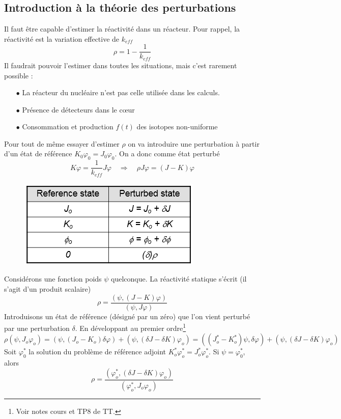 	\subsection{Introduction à la théorie des perturbations}
	Il faut être capable d'estimer la réactivité dans un réacteur. Pour rappel, la réactivité est la 
	variation effective de $k_{eff}$
	\begin{equation}
	\rho  = 1 - \frac{1}{{{k_{eff}}}}
	\end{equation}	
	Il faudrait pouvoir l'estimer dans toutes les situations, mais c'est rarement possible :
	\begin{itemize}
	\item[$\bullet$] La réacteur du nucléaire n'est pas celle utilisée dans les calculs.
	\item[$\bullet$] Présence de détecteurs dans le cœur
	\item[$\bullet$] Consommation et production $f(t)$ des isotopes non-uniforme 		
	\end{itemize}
	Pour tout de même essayer d'estimer $\rho$ on va introduire une perturbation à partir d'un état
	de référence $K_0\varphi_0 = J_0\varphi_0$. On a donc comme état perturbé
	\begin{equation}
	K\varphi  = \frac{1}{{{k_{eff}}}}J\varphi \quad\Rightarrow\quad 
	\rho J\varphi  = (J - K)\varphi 
	\end{equation}
	
	\begin{figure}
	\vspace{-5mm}
	\includegraphics[scale=0.6]{ch6/image2.png}
	\end{figure}	
	Considérons une fonction poids $\psi$ quelconque. La réactivité statique s'écrit (il s'agit d'un
	produit scalaire)
	\begin{equation}
	\rho  = \frac{{(\psi ,(J - K)\varphi )}}{{(\psi ,J\varphi )}}
	\end{equation}
	Introduisons un état de référence (désigné par un zéro) que l'on vient perturbé par une 
	perturbation $\delta$. En développant au premier ordre\footnote{Voir notes cours et TP8 de 
	TT.}
	\begin{equation}
	\rho (\psi ,{J_o}{\varphi _o}) = (\psi ,({J_o} - {K_o})\delta \varphi ) + (\psi ,(\delta J -
	\delta K){\varphi _o}) = ((J_o^* - K_o^*)\psi ,\delta \varphi ) + (\psi ,(\delta J - \delta K)
	{\varphi _o})	
	\end{equation}
	Soit $\varphi_0^*$ la solution du problème de référence adjoint $K_o^*\varphi _o^* = J_o^*\varphi
	 _o^*$. Si $\psi=\varphi_0^*$, alors 
	 \begin{equation}
	 \rho  = \frac{{(\varphi _o^*,(\delta J - \delta K){\varphi _o})}}{{(\varphi _o^*,{J_o}{\varphi
	  _o})}}
	 \end{equation}
	
